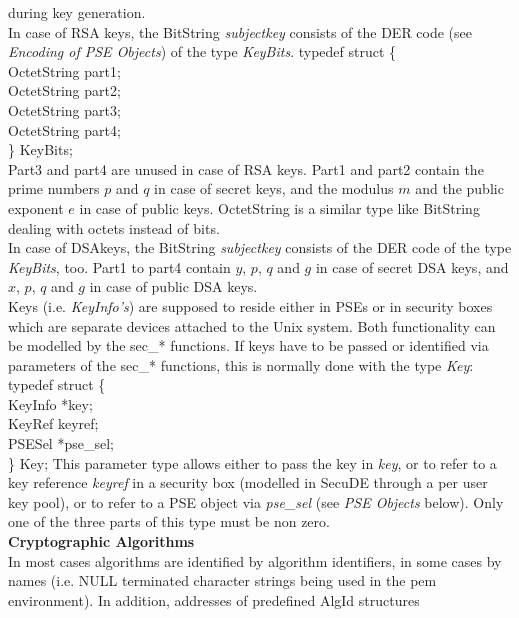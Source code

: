 during key generation. 
\\ [1em]
In case of RSA keys, the BitString {\em subjectkey} consists of the DER 
code (see {\em Encoding of PSE Objects}) of the type {\em KeyBits}.
{\small
\btab
\2      typedef struct \{ \\
\3	        OctetString \2 part1; \\
\3      	OctetString \2 part2; \\
\3      	OctetString \2 part3; \\
\3      	OctetString \2 part4; \\
\2      \} KeyBits; \\
\etab
}
Part3 and part4 are unused in case of RSA keys.
Part1 and part2 contain the prime numbers $p$ and $q$ in case of secret keys, and the 
modulus $m$ and the public exponent $e$ in case of public keys. OctetString is a similar
type like BitString dealing with octets instead of bits. 
\\ [1em]
In case of DSAkeys, the BitString {\em subjectkey} consists of the DER 
code  of the type {\em KeyBits}, too.
Part1 to part4 contain $y$, $p$, $q$ and $g$ in case of secret DSA keys, and  
$x$, $p$, $q$ and $g$ in case of public DSA keys. 
\\ [1em]
Keys (i.e. {\em KeyInfo's}) are supposed to reside either in PSEs or in security boxes
which are separate devices attached to the Unix system. Both functionality can be modelled by
the sec\_* functions. If keys have to be passed or identified via
parameters of the sec\_* functions, this is normally done with the type 
{\em Key}:
{\small
\btab
\2 typedef struct \{ \\
\3      KeyInfo  \1 *key; \\
\3      KeyRef   \1  keyref; \\
\3      PSESel    \1 *pse\_sel; \\
\2 \} Key;
\etab
}
This parameter type allows either to pass the key in {\em key}, or to refer 
to a key reference
{\em keyref} in a security box (modelled in SecuDE through a per user key 
pool), 
or to refer to a PSE object via {\em pse\_sel} (see {\em PSE Objects} 
below). 
Only one of the three parts of this type must be non zero. 
\\ [1em]
{\bf Cryptographic Algorithms}
\\ [1em]
In most cases algorithms are identified by algorithm identifiers, in some 
cases by names (i.e.
NULL terminated character strings being used in the pem environment). 
In addition, addresses of predefined AlgId structures
